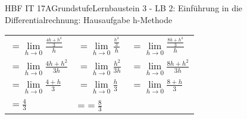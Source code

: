 \documentclass[oneside,openany,headings=optiontotoc,11pt,numbers=noenddot]{scrreprt}
\begin{document}
\begin{worksheet}{HBF IT 17A}{Grundstufe}{Lernbaustein 3 - LB 2: Einführung in die Differentialrechnung: Hausaufgabe h-Methode}
\begin{framed}
\begin{tabularx}{\textwidth}{X|X|X}
				\(=\lim\limits_{h \to 0}\frac{\frac{4h+h^2}{3}}{h}\) & \(=\lim\limits_{h \to 0}\frac{\frac{h^2}{3}}{h}\) & \(=\lim\limits_{h \to 0}\frac{\frac{8h+h^2}{3}}{h}\)\\
				\(=\lim\limits_{h \to 0}\frac{4h+h^2}{3h}\) & \(=\lim\limits_{h \to 0}\frac{h^2}{3h}\) & \(=\lim\limits_{h \to 0}\frac{8h+h^2}{3h}\)\\
				\(=\lim\limits_{h \to 0}\frac{4+h}{3}\) & \(=\lim\limits_{h \to 0}\frac{h}{3}\) & \(=\lim\limits_{h \to 0}\frac{8+h}{3}\)\\
				\(=\frac{4}{3}\) & =\(= \frac{8}{3}\)
			\end{tabularx}
		\end{framed}
	\end{worksheet}
\end{document}

